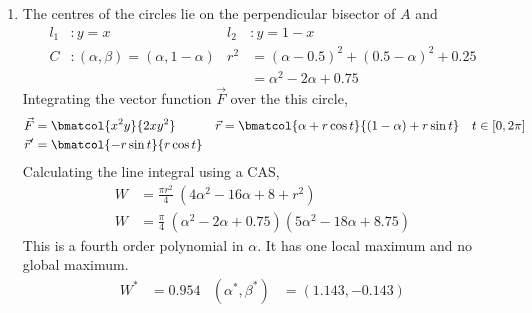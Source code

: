\begin{enumerate}
    \item The centres of the circles lie on the perpendicular bisector of $ A $ and
          \begin{align}
              l_1 & : y = x                                      &
              l_2 & : y = 1 - x                                    \\
              C   & : (\alpha, \beta) = (\alpha, 1 - \alpha)     &
              r^2 & = (\alpha - 0.5)^2 + (0.5 - \alpha)^2 + 0.25   \\
                  &                                              &
                  & = \alpha^2 - 2\alpha + 0.75
          \end{align}
          Integrating the vector function $ \vec{F} $ over the this circle,
          \begin{align}
              \vec{F}  & = \bmatcol{x^2y}{2xy^2}         &
              \vec{r}  & = \bmatcol{\alpha + r\cos t}
              {(1 - \alpha) + r \sin t} \quad
              t \in [0, 2\pi]                              \\
              \vec{r}' & = \bmatcol{-r \sin t}{r \cos t}
          \end{align}
          Calculating the line integral using a CAS,
          \begin{align}
              W                 & = \frac{\pi r^2}{4}\ (4\alpha^2 - 16\alpha + 8
              + r^2)                                                             \\
              W                 & = \frac{\pi}{4}\ (\alpha^2 - 2\alpha + 0.75)
              (5\alpha^2 - 18\alpha + 8.75)
          \end{align}
          This is a fourth order polynomial in $ \alpha $. It has one local maximum and
          no global maximum. 
          \begin{align}
            W^* &= 0.954 & (\alpha^*, \beta^*) &= (1.143, -0.143)
          \end{align}


\end{enumerate}

